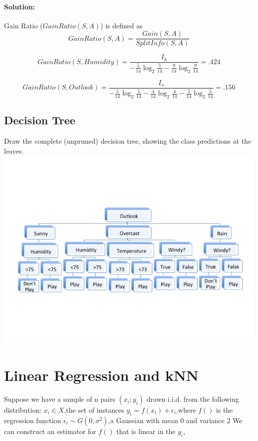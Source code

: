 \documentclass{article}
\begin{document}
\paragraph{Solution:}
Gain Ratio ($GainRatio(S,A)$) is defined as
$$ GainRatio(S,A) = \frac{Gain(S,A)}{SplitInfo(S,A)}
$$ 

$$ GainRatio(S,Humidity) = \frac{I_h}{-\frac{5}{14}\log_2\frac{5}{14} - \frac{9}{14}\log_2\frac{9}{14}} = .424
$$

$$ GainRatio(S,Outlook) = \frac{I_o}{-\frac{5}{14}\log_2\frac{5}{14} - \frac{4}{14}\log_2\frac{4}{14} - \frac{5}{14}\log_2\frac{5}{14}} = .156
$$

\subsection {Decision Tree} 
Draw the complete (unpruned) decision tree, showing the class predictions at the leaves. 
\linebreak
\includegraphics[width = \linewidth]{dTree_un.png}
\linebreak

\section{Linear Regression and kNN}

Suppose we have a sample of n pairs $(x_i; y_i)$ drawn i.i.d. from the following
distribution:
\newline
$x_i\in X$,the set of instances
\newline 
$y_i = f(x_i) + \epsilon_i$,where $f()$ is the regression function
\newline 
$\epsilon_i \sim G(0,\sigma^2)$,a Gaussian with mean 0 and variance 2
\newline 
We can construct an estimator for $f()$ that is linear in the $y_i$,
\end{document}
